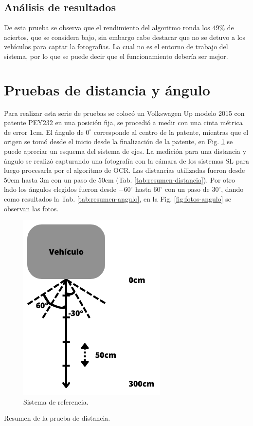 \subsection{Análisis de resultados}

De esta prueba se observa que el rendimiento del algoritmo ronda los $49\%$ de aciertos, que se considera bajo, sin embargo cabe destacar que no se detuvo a los vehículos para captar la fotografías. La cual no es el entorno de trabajo del sistema, por lo que se puede decir que el funcionamiento debería ser mejor.

\section{Pruebas de distancia y ángulo}

Para realizar esta serie de pruebas se colocó un Volkswagen Up modelo 2015 con patente PEY232 en una posición fija, se procedió a medir con una cinta métrica de error 1cm. El ángulo de $0^\circ$ corresponde al centro de la patente, mientras que el origen se tomó desde el inicio desde la finalización de la patente, en Fig. \ref{fig:sistema-medicion-angulos} se puede apreciar un esquema del sistema de ejes. La medición para una distancia y ángulo se realizó capturando una fotografía con la cámara de los sistemas SL para luego procesarla por el algoritmo de OCR. Las distancias utilizadas fueron desde 50cm hasta 3m con un paso de 50cm (Tab. \ref{tab:resumen-distancia}). Por otro lado los ángulos elegidos fueron desde $-60^\circ$ hasta $60^\circ$ con un paso de $30^\circ$, dando como resultados la Tab. \ref{tab:resumen-angulo}, en la Fig. \ref{fig:fotos-angulo} se observan las fotos.

\begin{figure}
    \centering
    \includegraphics[width=.3\textwidth]{imgs/sistema-referencia.png}
    \caption{Sistema de referencia.}
    \label{fig:sistema-medicion-angulos}
\end{figure}

\begin{table}
    \centering
    
    \caption{Resumen de la prueba de distancia.}
    \label{tab:resumen-distancia}
\end{table}

